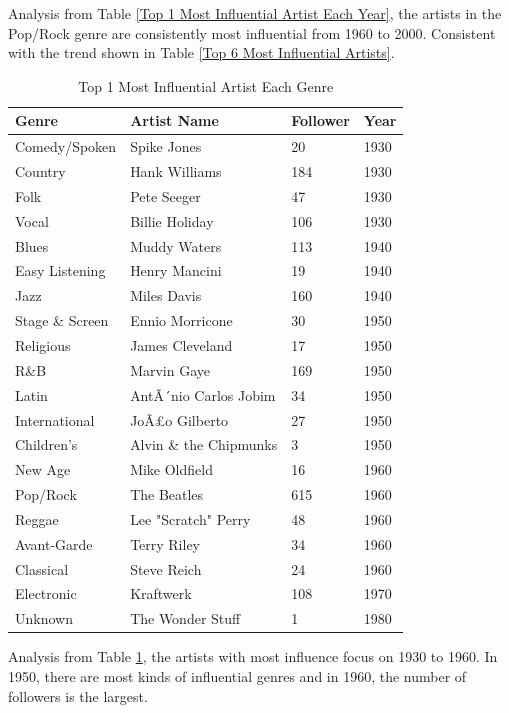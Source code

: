 \documentclass[12pt]{article}
\begin{document}
Analysis from Table \ref{Top 1 Most Influential Artist Each Year}, the artists in the Pop/Rock genre are consistently most influential from 1960 to 2000. Consistent with the trend shown in Table \ref{Top 6 Most Influential Artists}.


\begin{table} [H] 
\begin{center}
\begin{tabular}{p{80pt}p{160pt}p{80pt}p{80pt}}
\toprule
Genre & Artist Name & Follower & Year\\
\midrule
Comedy/Spoken & Spike Jones	& 20	&	1930\\
Country & Hank Williams	& 184	&	1930\\
Folk & Pete Seeger	& 47	&	1930\\
Vocal & Billie Holiday &	106	&	1930\\
Blues & Muddy Waters &	113	& 1940\\
Easy Listening & Henry Mancini	& 19 & 	1940\\
Jazz & Miles Davis	& 160	&	1940\\
Stage \& Screen & Ennio Morricone &	30	&	1950\\
Religious & James Cleveland	& 17	&	1950\\
R\&B & Marvin Gaye &	169	&	1950\\
Latin & AntÃ´nio Carlos Jobim &	34	&	1950\\
International & JoÃ£o Gilberto &	27	&	1950\\
Children's & Alvin \& the Chipmunks	& 3	&	1950\\
New Age & Mike Oldfield &	16	&	1960\\
Pop/Rock & The Beatles &	615	&	1960\\
Reggae & Lee "Scratch" Perry &	48	&	1960\\
Avant-Garde & Terry Riley	& 34 & 1960\\
Classical & Steve Reich	& 24	&	1960\\
Electronic & Kraftwerk &	108	&	1970\\
Unknown & The Wonder Stuff	& 1	&	1980\\
\bottomrule
\end{tabular}
\end{center}
\caption{Top 1 Most Influential Artist Each Genre}
\label{Top 1 Most Influential Artist Each Genre}
\end{table}

Analysis from Table \ref{Top 1 Most Influential Artist Each Genre}, the artists with most influence focus on 1930 to 1960. In 1950, there are most kinds of influential genres and in 1960, the number of followers is the largest.
\end{document}
